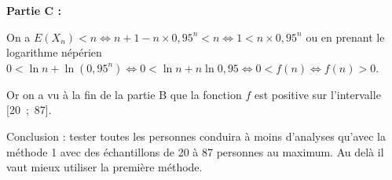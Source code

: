 \documentclass[10pt]{article}
\begin{document}
\bigskip

\textbf{Partie C :}

\medskip








On a $E\left(X_n\right)  < n \iff n + 1 - n \times 0,95^n < n \iff 1 < n \times 0,95^n$ ou en prenant le logarithme népérien $0 < \ln n + \ln \left(0,95^n\right) \iff 0 < \ln n + n \ln 0,95 \iff 0 < f(n) \iff f(n) > 0$.

Or on a vu à la fin de la partie B que la fonction $f$ est positive sur l'intervalle [20~;~87].

Conclusion : tester toutes les personnes conduira à moins d'analyses qu'avec la méthode 1 avec des échantillons de 20 à 87 personnes au maximum. Au delà il vaut mieux utiliser la première méthode.
\bigskip
\end{document}
